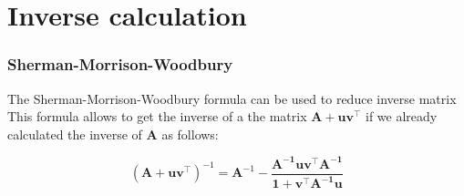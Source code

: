 \documentclass{beamer}
\begin{document}
\section{Inverse calculation}
\begin{frame}
\frametitle{Sherman-Morrison-Woodbury}
The Sherman-Morrison-Woodbury formula can be used to reduce inverse matrix
This
formula allows to get the inverse of a
the matrix $\mathbf{A+uv^\top}$ if we already calculated the
inverse of $\mathbf{A}$ as follows:

\begin{equation}
\label{eq:SMW}
(\mathbf{A+uv^\top})^{-1}=\mathbf{A}^{-1}-
\frac{\mathbf{A^{-1}uv^\top A^{-1}}}{\mathbf{1+v^\top A^{-1}u}}
\end{equation}
\end{frame}
\end{document}
